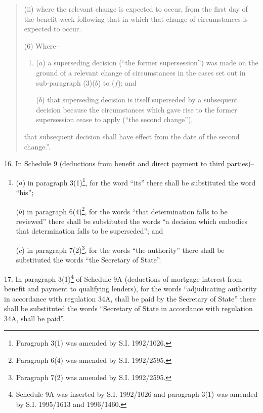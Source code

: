 \documentclass[12pt,a4paper]{article}
\begin{document}
\begin{enumerate}
\begin{enumerate}
\begin{quotation}
\begin{enumerate}
(ii) where the relevant change is expected to occur, from the first day of the benefit week following that in which that change of circumstances is expected to occur.
\end{enumerate}

(6) Where–
\begin{enumerate}\item[]
($a$) a superseding decision (“the former supersession”) was made on the ground of a relevant change of circumstances in the cases set out in sub-paragraph (3)($b$)  to ($f$); and

($b$) that superseding decision is itself superseded by a subsequent decision because the circumstances which gave rise to the former supersession cease to apply (“the second change”),
\end{enumerate}
that subsequent decision shall have effect from the date of the second change.”.
\end{quotation}
\end{enumerate}
\end{enumerate}

\medskip

16.  In Schedule 9 (deductions from benefit and direct payment to third parties)–
\begin{enumerate}\item[]
($a$) in paragraph 3(1)\footnote{\frenchspacing Paragraph 3(1) was amended by S.I. 1992/1026.}, for the word “its” there shall be substituted the word “his”;

($b$) in paragraph 6(4)\footnote{\frenchspacing Paragraph 6(4) was amended by S.I. 1992/2595.}, for the words “that determination falls to be reviewed” there shall be substituted the words “a decision which embodies that determination falls to be superseded”; and

($c$) in paragraph 7(2)\footnote{\frenchspacing Paragraph 7(2) was amended by S.I. 1992/2595.}, for the words “the authority” there shall be substituted the words “the Secretary of State”.
\end{enumerate}

\medskip

17.  In paragraph 3(1)\footnote{\frenchspacing Schedule 9A was inserted by S.I. 1992/1026 and paragraph 3(1) was amended by S.I. 1995/1613 and 1996/1460.} of Schedule 9A (deductions of mortgage interest from benefit and payment to qualifying lenders), for the words “adjudicating authority in accordance with regulation 34A, shall be paid by the Secretary of State” there shall be substituted the words “Secretary of State in accordance with regulation 34A, shall be paid”.
\end{document}
